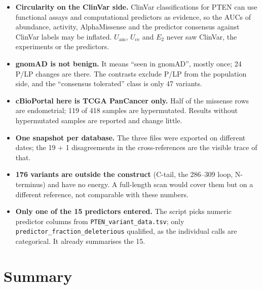 \documentclass[11pt,a4paper]{article}
\newcommand{\file}[1]{\texttt{#1}}
\newcommand{\Uam}{U_{\mathrm{am}}}
\newcommand{\Uce}{U_{\mathrm{ce}}}
\newcommand{\Etwo}{E_{2}}
\begin{document}
\begin{itemize}
\item \textbf{Circularity on the ClinVar side.} ClinVar classifications for
  PTEN can use functional assays and computational predictors as evidence, so
  the AUCs of abundance, activity, AlphaMissense and the predictor consensus
  against ClinVar labels may be inflated. $\Uam$, $\Uce$ and $\Etwo$ never saw
  ClinVar, the experiments or the predictors.
\item \textbf{gnomAD is not benign.} It means ``seen in gnomAD'', mostly once;
  24 P/LP changes are there. The contrasts exclude P/LP from the population
  side, and the ``consensus tolerated'' class is only 47 variants.
\item \textbf{cBioPortal here is TCGA PanCancer only.} Half of the missense
  rows are endometrial; 119 of 418 samples are hypermutated. Results without
  hypermutated samples are reported and change little.
\item \textbf{One snapshot per database.} The three files were exported on
  different dates; the 19 + 1 disagreements in the cross-references are the
  visible trace of that.
\item \textbf{176 variants are outside the construct} (C-tail, the 286--309
  loop, N-terminus) and have no energy. A full-length scan would cover them
  but on a different reference, not comparable with these numbers.
\item \textbf{Only one of the 15 predictors entered.} The script picks numeric
  predictor columns from \file{PTEN\_variant\_data.tsv}; only
  \texttt{predictor\_fraction\_deleterious} qualified, as the individual calls
  are categorical. It already summarises the 15.
\end{itemize}

\section{Summary}
\end{document}
